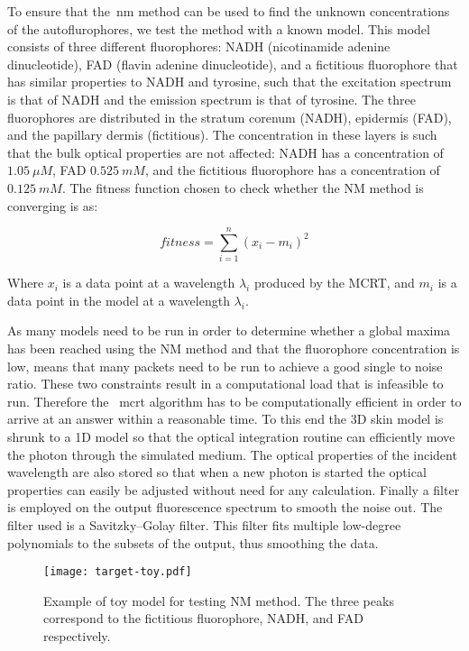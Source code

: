To ensure that the~\gls*{nm} method can be used to find the unknown concentrations of the autoflurophores, we test the method with a known model.
This model consists of three different fluorophores: NADH (nicotinamide adenine dinucleotide), FAD (flavin adenine dinucleotide), and a fictitious fluorophore that has similar properties to NADH and tyrosine, such that the excitation spectrum is that of NADH and the emission spectrum is that of tyrosine.
The three fluorophores are distributed in the stratum corenum (NADH), epidermis (FAD), and the papillary dermis (fictitious).
The concentration in these layers is such that the bulk optical properties are not affected: NADH has a concentration of $1.05~\mu M$, FAD $0.525~m M$, and the fictitious fluorophore has a concentration of $0.125~mM$. %
The fitness function chosen to check whether the NM method is converging is as:

\begin{equation}
fitness = \sum\limits_{i=1}^{n}(x_i-m_i)^2
\end{equation}

Where $x_i$ is a data point at a wavelength $\lambda_i$ produced by the MCRT, and $m_i$ is a data point in the model at a wavelength $\lambda_i$.

As many models need to be run in order to determine whether a global maxima has been reached using the NM method and that the fluorophore concentration is low, means that many packets need to be run to achieve a good single to noise ratio.
These two constraints result in a computational load that is infeasible to run. 
Therefore the ~\gls*{mcrt} algorithm has to be computationally efficient in order to arrive at an answer within a reasonable time.
To this end the 3D skin model is shrunk to a 1D model so that the optical integration routine can efficiently move the photon through the simulated medium.
The optical properties of the incident wavelength are also stored so that when a new photon is started the optical properties can easily be adjusted without need for any calculation.
Finally a filter is employed on the output fluorescence spectrum to smooth the noise out.
The filter used is a Savitzky–Golay filter.
This filter fits multiple low-degree polynomials to the subsets of the output, thus smoothing the data. 


\begin{figure}[!htbp]
	\centering
	\texttt{[image: target-toy.pdf]}
	\caption{Example of toy model for testing NM method. The three peaks correspond to the fictitious fluorophore, NADH, and FAD respectively.}
	\label{fig:figure1}
\end{figure}

